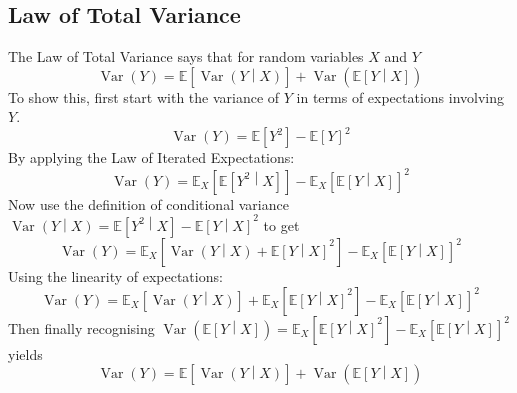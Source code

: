 \documentclass[11pt]{report} %
\begin{document}
\subsection{Law of Total Variance}

The Law of Total Variance says that for random variables $X$ and $Y$
\begin{equation}
\operatorname{Var}\left(Y\right) = \mathbb{E}\left[\operatorname{Var}\left(Y\middle|X\right)\right] + \operatorname{Var}\left(\mathbb{E}\left[Y\middle|X\right]\right)
\end{equation}
To show this, first start with the variance of $Y$ in terms of expectations involving $Y$.
\begin{equation}
\operatorname{Var}\left(Y\right) = \mathbb{E}\left[Y^{2}\right] - \mathbb{E}\left[Y\right]^{2}
\end{equation}
By applying the Law of Iterated Expectations:
\begin{equation}
\operatorname{Var}\left(Y\right) = \mathbb{E}_{X}\left[\mathbb{E}\left[Y^{2}\middle|X\right]\right] - \mathbb{E}_{X}\left[\mathbb{E}\left[Y\middle|X\right]\right]^{2}
\end{equation}
Now use the definition of conditional variance $\operatorname{Var}\left(Y\middle|X\right) = \mathbb{E}\left[Y^{2}\middle|X\right] - \mathbb{E}\left[Y\middle|X\right]^{2}$ to get
\begin{equation}
\operatorname{Var}\left(Y\right) = \mathbb{E}_{X}\left[\operatorname{Var}\left(Y\middle|X\right) + \mathbb{E}\left[Y\middle|X\right]^{2}\right] - \mathbb{E}_{X}\left[\mathbb{E}\left[Y\middle|X\right]\right]^{2}
\end{equation}
Using the linearity of expectations:
\begin{equation}
\operatorname{Var}\left(Y\right) = \mathbb{E}_{X}\left[\operatorname{Var}\left(Y\middle|X\right)\right] + \mathbb{E}_{X}\left[\mathbb{E}\left[Y\middle|X\right]^{2}\right] - \mathbb{E}_{X}\left[\mathbb{E}\left[Y\middle|X\right]\right]^{2}
\end{equation}
Then finally recognising $\operatorname{Var}\left(\mathbb{E}\left[Y\middle|X\right]\right) = \mathbb{E}_{X}\left[\mathbb{E}\left[Y\middle|X\right]^{2}\right] - \mathbb{E}_{X}\left[\mathbb{E}\left[Y\middle|X\right]\right]^{2}$ yields
\begin{equation}
\operatorname{Var}\left(Y\right) = \mathbb{E}\left[\operatorname{Var}\left(Y\middle|X\right)\right] + \operatorname{Var}\left(\mathbb{E}\left[Y\middle|X\right]\right)
\end{equation}
\end{document}
